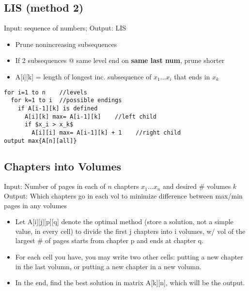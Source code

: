 \documentclass[12pt]{article}
\providecommand{\tightlist}{
    \setlength{\itemsep}{0pt}\setlength{\parskip}{0pt}
}
\begin{document}
\subsection{LIS (method 2)}
Input: sequence of numbers; Output: LIS\\
\begin{itemize}
  \item Prune nonincreasing subsequences
  \item If 2 subsequences @ same level end on \textbf{same last num}, prune shorter
  \item A[i][k] = length of longest inc. subsequence of $x_1 \dots x_i$ that ends in $x_k$
\end{itemize}
\begin{lstlisting}
for i=1 to n    //levels
  for k=1 to i  //possible endings
    if A[i-1][k] is defined
      A[i][k] max= A[i-1][k]    //left child
      if $x_i > x_k$
        A[i][i] max= A[i-1][k] + 1    //right child
output max{A[n][all]}
\end{lstlisting}







\subsection{Chapters into Volumes}
Input: Number of pages in each of $n$ chapters $x_1 \dots x_n$ and desired \# volumes $k$\\
Output: Which chapters go in each vol to minimize difference between max/min pages in any volumes
\begin{itemize}\tightlist
  \item Let A[i][j][p][q] denote the optimal method (store a solution, not a simple value, in every cell) to divide the first j chapters into i volumes, w/ vol of the largest \# of pages starts from chapter p and ends at chapter q.
  \item For each cell you have, you may write two other cells: putting a new chapter in the last volumn, or putting a new chapter in a new volumn.
  \item In the end, find the best solution in matrix A[k][n], which will be the output.
\end{itemize}
\end{document}

